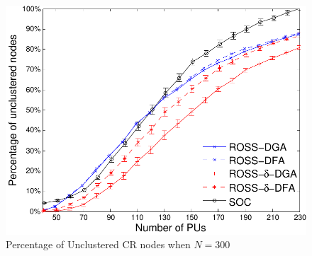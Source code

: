 \documentclass[times]{ettauth}
\theoremstyle{mytheoremstyle}
\theoremstyle{mytheoremstyle}
\theoremstyle{mytheoremstyle}
\begin{document}
\begin{figure}[t]
\begin{multicols}{3}
    \includegraphics[width=\linewidth]{survival_rate_300_edge50.pdf}\par\caption{Percentage of Unclustered CR nodes when $N=300$}\label{singleton_clusters_300}
\end{multicols}
\end{figure}

\end{document}
